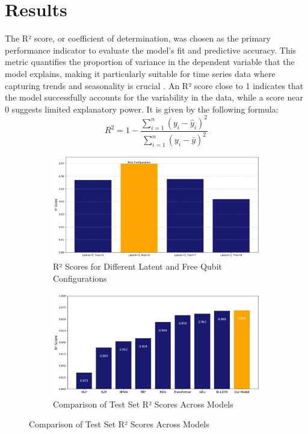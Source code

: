 \documentclass[conference]{IEEEtran}
\begin{document}
 \section{Results}
 The R² score, or coefficient of determination, was chosen as the primary performance indicator to evaluate the model's fit and predictive accuracy. This metric quantifies the proportion of variance in the dependent variable that the model explains, making it particularly suitable for time series data where capturing trends and seasonality is crucial \cite{b20}. An R² score close to 1 indicates that the model successfully accounts for the variability in the data, while a score near 0 suggests limited explanatory power. It is given by the following formula:
\[R^2 = 1 - \frac{\sum_{i=1}^n (y_i - \hat{y}_i)^2}{\sum_{i=1}^n (y_i - \bar{y})^2}\]
\begin{figure}[ht]
    \centering
    \begin{subfigure}[b]{0.48\textwidth}
        \centering
        \includegraphics[width=\textwidth]{configs.png}
        \caption{R² Scores for Different Latent and Free Qubit Configurations}
    \end{subfigure}
    \begin{subfigure}[b]{0.48\textwidth}
        \centering
        \includegraphics[width=\textwidth]{compar.png}
        \caption{Comparison of Test Set R² Scores Across Models}
    \end{subfigure}
\end{figure}
\end{document}
